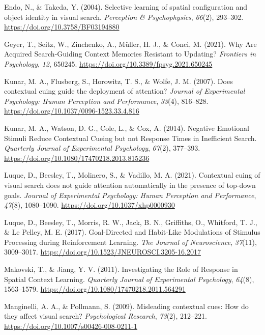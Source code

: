 \documentclass[
  man,
  floatsintext,
  longtable,
  nolmodern,
  notxfonts,
  notimes,
  colorlinks=true,linkcolor=blue,citecolor=blue,urlcolor=blue]{apa7}
\newlength{\cslhangindent}
\newenvironment{CSLReferences}[2] %
 {\begin{list}{}{%
  \setlength{\itemindent}{0pt}
  \setlength{\leftmargin}{0pt}
  \setlength{\parsep}{0pt}
  \ifodd #1
   \setlength{\leftmargin}{\cslhangindent}
   \setlength{\itemindent}{-1\cslhangindent}
  \fi
  \setlength{\itemsep}{#2\baselineskip}}}
 {\end{list}}
\begin{document}
\begin{CSLReferences}{1}{0}
Endo, N., \& Takeda, Y. (2004). Selective learning of spatial
configuration and object identity in visual search. \emph{Perception \&
Psychophysics}, \emph{66}(2), 293--302.
\url{https://doi.org/10.3758/BF03194880}

Geyer, T., Seitz, W., Zinchenko, A., Müller, H. J., \& Conci, M. (2021).
Why {Are Acquired Search-Guiding Context Memories Resistant} to
{Updating}? \emph{Frontiers in Psychology}, \emph{12}, 650245.
\url{https://doi.org/10.3389/fpsyg.2021.650245}

Kunar, M. A., Flusberg, S., Horowitz, T. S., \& Wolfe, J. M. (2007).
Does contextual cuing guide the deployment of attention? \emph{Journal
of Experimental Psychology: Human Perception and Performance},
\emph{33}(4), 816--828. \url{https://doi.org/10.1037/0096-1523.33.4.816}

Kunar, M. A., Watson, D. G., Cole, L., \& Cox, A. (2014). Negative
{Emotional Stimuli Reduce Contextual Cueing} but not {Response Times} in
{Inefficient Search}. \emph{Quarterly Journal of Experimental
Psychology}, \emph{67}(2), 377--393.
\url{https://doi.org/10.1080/17470218.2013.815236}

Luque, D., Beesley, T., Molinero, S., \& Vadillo, M. A. (2021).
Contextual cuing of visual search does not guide attention automatically
in the presence of top-down goals. \emph{Journal of Experimental
Psychology: Human Perception and Performance}, \emph{47}(8), 1080--1090.
\url{https://doi.org/10.1037/xhp0000930}

Luque, D., Beesley, T., Morris, R. W., Jack, B. N., Griffiths, O.,
Whitford, T. J., \& Le Pelley, M. E. (2017). Goal-{Directed} and
{Habit-Like Modulations} of {Stimulus Processing} during {Reinforcement
Learning}. \emph{The Journal of Neuroscience}, \emph{37}(11),
3009--3017. \url{https://doi.org/10.1523/JNEUROSCI.3205-16.2017}

Makovski, T., \& Jiang, Y. V. (2011). Investigating the {Role} of
{Response} in {Spatial Context Learning}. \emph{Quarterly Journal of
Experimental Psychology}, \emph{64}(8), 1563--1579.
\url{https://doi.org/10.1080/17470218.2011.564291}

Manginelli, A. A., \& Pollmann, S. (2009). Misleading contextual cues:
{How} do they affect visual search? \emph{Psychological Research},
\emph{73}(2), 212--221. \url{https://doi.org/10.1007/s00426-008-0211-1}


\end{CSLReferences}
\end{document}
